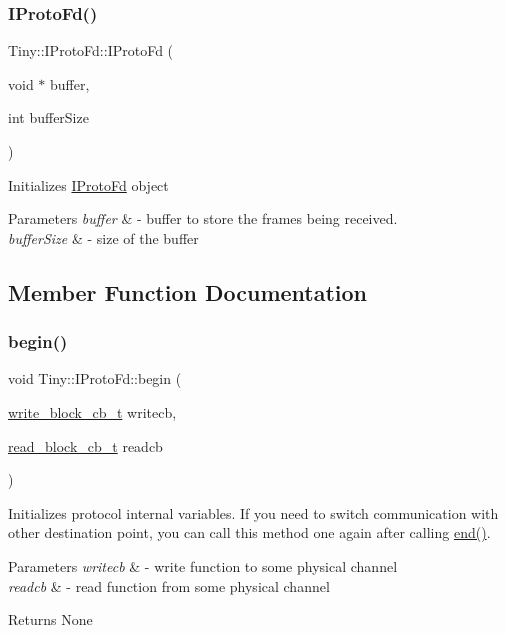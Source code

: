 \subsubsection{\texorpdfstring{I\+Proto\+Fd()}{IProtoFd()}}
{\footnotesize\ttfamily Tiny\+::\+I\+Proto\+Fd\+::\+I\+Proto\+Fd (\begin{DoxyParamCaption}\item[{void $\ast$}]{buffer,  }\item[{int}]{buffer\+Size }\end{DoxyParamCaption})\hspace{0.3cm}{\ttfamily [inline]}}

Initializes \hyperlink{classTiny_1_1IProtoFd}{I\+Proto\+Fd} object 
\begin{DoxyParams}{Parameters}
{\em buffer} & -\/ buffer to store the frames being received. \\
\hline
{\em buffer\+Size} & -\/ size of the buffer \\
\hline
\end{DoxyParams}


\subsection{Member Function Documentation}
\mbox{\label{classTiny_1_1IProtoFd_aae4e613316866105c130d613ecb25dd4}} 
\subsubsection{\texorpdfstring{begin()}{begin()}}
{\footnotesize\ttfamily void Tiny\+::\+I\+Proto\+Fd\+::begin (\begin{DoxyParamCaption}\item[{\hyperlink{tiny__types_8h_aafd634660bba76cace57a8f9b01e044d}{write\+\_\+block\+\_\+cb\+\_\+t}}]{writecb,  }\item[{\hyperlink{tiny__types_8h_a15bec127d9ee63658563d62e92b5261b}{read\+\_\+block\+\_\+cb\+\_\+t}}]{readcb }\end{DoxyParamCaption})}

Initializes protocol internal variables. If you need to switch communication with other destination point, you can call this method one again after calling \hyperlink{classTiny_1_1IProtoFd_ad17e76d0ef7ea40838e51acc2498c482}{end()}. 
\begin{DoxyParams}{Parameters}
{\em writecb} & -\/ write function to some physical channel \\
\hline
{\em readcb} & -\/ read function from some physical channel \\
\hline
\end{DoxyParams}
\begin{DoxyReturn}{Returns}
None 
\end{DoxyReturn}
\mbox{\label{classTiny_1_1IProtoFd_a1cf42b4182e49dcde4862a768d07c811}} 
